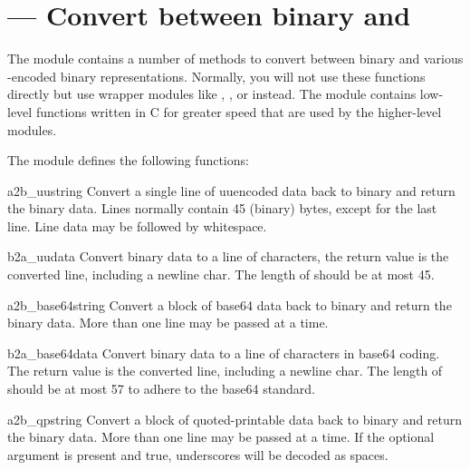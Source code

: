 \section{ ---
         Convert between binary and \ASCII}



The  module contains a number of methods to convert
between binary and various \ASCII-encoded binary
representations. Normally, you will not use these functions directly
but use wrapper modules like ,
, or
 instead. The  module
contains low-level functions written in C for greater speed
that are used by the higher-level modules.

The  module defines the following functions:

\begin{funcdesc}{a2b_uu}{string}
Convert a single line of uuencoded data back to binary and return the
binary data. Lines normally contain 45 (binary) bytes, except for the
last line. Line data may be followed by whitespace.
\end{funcdesc}

\begin{funcdesc}{b2a_uu}{data}
Convert binary data to a line of \ASCII{} characters, the return value
is the converted line, including a newline char. The length of
 should be at most 45.
\end{funcdesc}

\begin{funcdesc}{a2b_base64}{string}
Convert a block of base64 data back to binary and return the
binary data. More than one line may be passed at a time.
\end{funcdesc}

\begin{funcdesc}{b2a_base64}{data}
Convert binary data to a line of \ASCII{} characters in base64 coding.
The return value is the converted line, including a newline char.
The length of  should be at most 57 to adhere to the base64
standard.
\end{funcdesc}

\begin{funcdesc}{a2b_qp}{string}
Convert a block of quoted-printable data back to binary and return the
binary data. More than one line may be passed at a time.
If the optional argument  is present and true, underscores
will be decoded as spaces.
\end{funcdesc}

